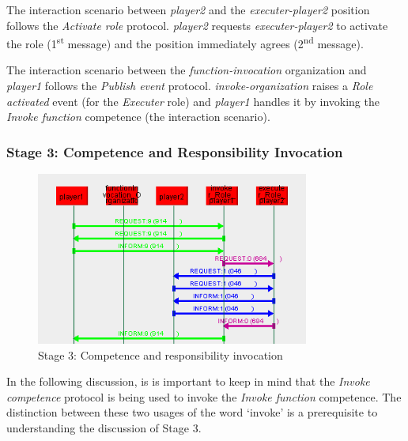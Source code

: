 The {} interaction scenario between \textit{player2} and the \textit{executer-player2} position follows the \textit{Activate role} protocol.
\textit{player2} requests \textit{executer-player2} to activate the role (1\textsuperscript{st} message) and the position immediately agrees (2\textsuperscript{nd} message).

The {} interaction scenario between the \textit{function-invocation} organization and \textit{player1} follows the \textit{Publish event} protocol.
\textit{invoke-organization} raises a \textit{Role activated} event (for the \textit{Executer} role) and \textit{player1} handles it by invoking the \textit{Invoke function} competence (the {} interaction scenario).

\subsubsection*{Stage 3: Competence and Responsibility Invocation}

\begin{figure}[H]
	\centering
	\includegraphics[width=0.8\textwidth]{images/examples/example1-stage3.png}
	\caption{Stage 3: Competence and responsibility invocation}
	\label{figure:example1-stage3}
\end{figure}

In the following discussion, is is important to keep in mind that the \textit{Invoke competence} protocol is being used to invoke the \textit{Invoke function} competence.
The distinction between these two usages of the word `invoke' is a prerequisite to understanding the discussion of Stage 3.

